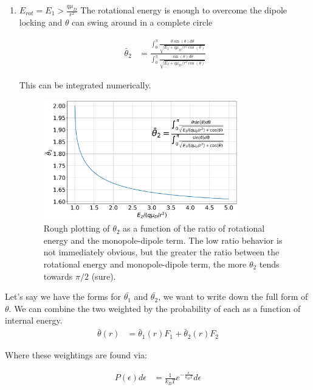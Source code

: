 \begin{enumerate}
\item $E_{rot} = E_1 > \frac{q \mu_D}{r^2}$
The rotational energy is enough to overcome the dipole locking and $\theta$ can swing around in a complete circle

\begin{align}
    \bar{\theta}_2 & = \frac{\int_0^\pi \frac{\theta \sin(\theta) d\theta}{\sqrt{E_2 + q \mu_D/r^2 \cos(\theta)}}}{\int_0^\pi \frac{\sin(\theta) d \theta}{\sqrt{E_2 + q \mu_D/r^2 \cos(\theta)}}}
\end{align}

This can be integrated numerically.
\begin{figure}[H]
\label{fig: theta2}
\centering
\includegraphics[width=0.8\textwidth]{images/ADO_theta2.png}
\caption{Rough plotting of $\theta_2$ as a function of the ratio of rotational energy and the monopole-dipole term. The low ratio behavior is not immediately obvious, but the greater the ratio between the rotational energy and monopole-dipole term, the more $\theta_2$ tends towards $\pi/2$ (sure).}
\end{figure}

\end{enumerate}

Let's say we have the forms for $\bar{\theta_1}$ and $\bar{\theta_2}$, we want to write down the full form of $\theta$. We can combine the two weighted by the probability of each as a function of internal energy.
\begin{align*}
    \bar{\theta}(r) & = \bar{\theta}_1(r) F_1 + \bar{\theta}_2(r) F_2
\end{align*}

Where these weightings are found via:

\begin{align*}
    P(\epsilon) d\epsilon & = \frac{1}{k_BT}e^{-\frac{\epsilon}{k_BT}}d\epsilon
\end{align*}

